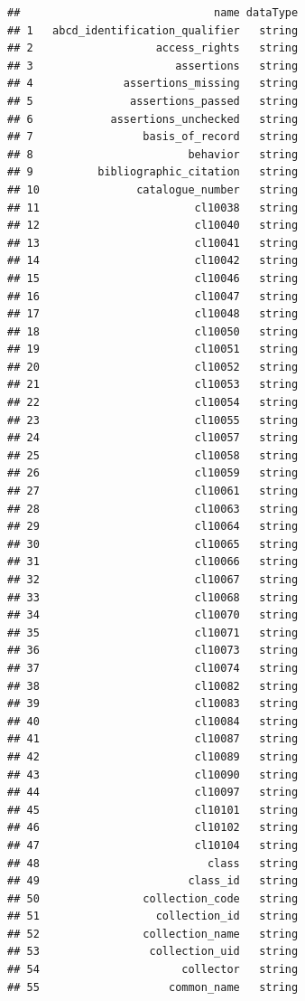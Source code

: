 \documentclass[
  10pt,
]{article}
\begin{document}
\begin{verbatim}
##                              name dataType
## 1   abcd_identification_qualifier   string
## 2                   access_rights   string
## 3                      assertions   string
## 4              assertions_missing   string
## 5               assertions_passed   string
## 6            assertions_unchecked   string
## 7                 basis_of_record   string
## 8                        behavior   string
## 9          bibliographic_citation   string
## 10               catalogue_number   string
## 11                        cl10038   string
## 12                        cl10040   string
## 13                        cl10041   string
## 14                        cl10042   string
## 15                        cl10046   string
## 16                        cl10047   string
## 17                        cl10048   string
## 18                        cl10050   string
## 19                        cl10051   string
## 20                        cl10052   string
## 21                        cl10053   string
## 22                        cl10054   string
## 23                        cl10055   string
## 24                        cl10057   string
## 25                        cl10058   string
## 26                        cl10059   string
## 27                        cl10061   string
## 28                        cl10063   string
## 29                        cl10064   string
## 30                        cl10065   string
## 31                        cl10066   string
## 32                        cl10067   string
## 33                        cl10068   string
## 34                        cl10070   string
## 35                        cl10071   string
## 36                        cl10073   string
## 37                        cl10074   string
## 38                        cl10082   string
## 39                        cl10083   string
## 40                        cl10084   string
## 41                        cl10087   string
## 42                        cl10089   string
## 43                        cl10090   string
## 44                        cl10097   string
## 45                        cl10101   string
## 46                        cl10102   string
## 47                        cl10104   string
## 48                          class   string
## 49                       class_id   string
## 50                collection_code   string
## 51                  collection_id   string
## 52                collection_name   string
## 53                 collection_uid   string
## 54                      collector   string
## 55                    common_name   string

\end{verbatim}
\end{document}
